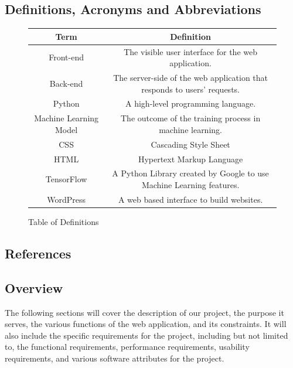 \documentclass[onecolumn, draftclsnofoot,10pt, compsoc]{IEEEtran}
\begin{document}
\subsection{Definitions, Acronyms and Abbreviations}
\begin{figure}[h!]
    \begin{center}
    	\begin{tabular}{ |c|c| }
    	    \hline
    	    \textbf{Term} & \textbf{Definition} \\
    		\hline
    		Front-end & The visible user interface for the web application. \\
    		\hline
    		Back-end & The server-side of the web application that responds to users' requests. \\
    		\hline
    		Python & A high-level programming language. \\
    		\hline
    		Machine Learning Model & The outcome of the training process in machine learning. \\
    		\hline
    		CSS & Cascading Style Sheet\\
    		\hline 
    		HTML & Hypertext Markup Language \\
    		\hline
    		TensorFlow & A Python Library created by Google to use Machine Learning features. \\
    		\hline
    		WordPress & A web based interface to build websites. \\
    		\hline 
    	\end{tabular}
    	\caption{Table of Definitions}
    \end{center}
    \label{fig:definition_table}
\end{figure}

\subsection{References}
\begingroup
\renewcommand{\addcontentsline}[3]{}%
\renewcommand{\section}[2]{}%


\endgroup
\subsection{Overview}
The following sections will cover the description of our project, the purpose it serves, the various functions of the web application, and its constraints. It will also include the specific requirements for the project, including but not limited to, the functional requirements, performance requirements, usability requirements, and various software attributes for the project.
\end{document}
